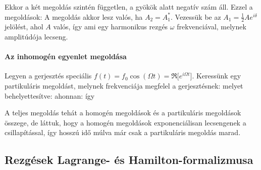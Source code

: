 \begin{itemize}
      Ekkor a két megoldás szintén független, a gyökök alatt negatív szám áll. Ezzel a megoldások:
      A megoldás akkor lesz valós, ha $A_2=A_1^*$. Vezessük be az $A_1=\frac{1}{2}Ae^{i\delta}$ jelölést, ahol $A$ valós, így
      ami egy harmonikus rezgés $\omega$ frekvenciával, melynek amplitúdója lecseng. 
    \end{itemize}
    
   \paragraph{Az inhomogén egyenlet megoldása}
    
    Legyen a gerjesztés speciális $f(t)=f_0\cos(\Omega t)=\Re\big[e^{i\Omega t} \big]$. Keressünk egy partikuláris megoldást, melynek frekvenciája megfelel a gerjesztésnek:
    melyet behelyettesítve:
    ahonnan:
    így
    
    A teljes megoldás tehát a homogén megoldások és a partikuláris megoldások összege, de láttuk, hogy a homogén megoldások exponenciálisan lecsengenek a csillapítással, így hosszú idő múlva már csak a partikuláris megoldás marad. 
    
  \subsection{Rezgések Lagrange- és Hamilton-formalizmusa}
   
